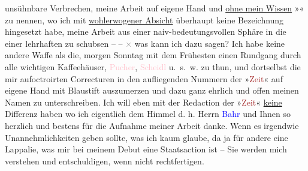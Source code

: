                     unsühnbare Verbrechen, meine Arbeit auf eigene Hand und \uline{ohne mein Wissen} »\label{K_L03697-2v}\label{}« zu nennen, wo ich mit {\pb}\uline{wohlerwogener Absicht}
                    überhaupt keine Bezeichnung hingesetzt habe, meine Arbeit aus einer
                    naiv-bedeutungsvollen Sphäre in die einer lehrhaften zu schubsen – – \textcolor{gray}{×} was kann ich dazu sagen? Ich
                    habe keine andere Waffe als die, morgen Sonntag mit dem Frühesten einen Rundgang
                    durch alle wichtigen Kaffeehäuser, \textcolor{pink}{Pucher}{}\ledrightnote{\textcolor{pink}{Café Pucher}},
                        \textcolor{pink}{Scheidl}{}\ledrightnote{\textcolor{pink}{Café Scheidl}} u. s. w. zu thun, und dortselbst
                    die mir aufoctroirten Correcturen in den aufliegenden Nummern der »\textcolor{brown}{Zeit}{}\ledrightnote{\textcolor{brown}{Die Zeit. Wiener Wochenschrift}}« auf eigene Hand mit Blaustift
                    auszumerzen und dazu {\pb}ganz ehrlich und offen meinen Namen zu unterschreiben.
                    Ich will eben mit der Redaction der »\textcolor{brown}{Zeit}{}\ledrightnote{\textcolor{brown}{Die Zeit. Wiener Wochenschrift}}«
                        \uline{keine} Differenz haben wo ich eigentlich dem
                    Himmel d. h. Herrn \textcolor{blue}{Bahr}{}\ledrightnote{\textcolor{blue}{Hermann Bahr}} und Ihnen so
                    herzlich und bestens für die Aufnahme meiner Arbeit danke. Wenn es irgendwie
                    Unannehmlichkeiten geben sollte, was ich kaum glaube, da ja für andere eine
                    Lappalie, was mir bei meinem Debut eine Staatsaction ist – Sie werden mich
                    verstehen und entschuldigen, wenn nicht rechtfertigen.\pend
           
